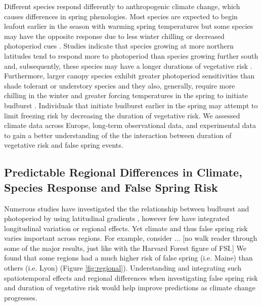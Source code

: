 \documentclass{article}\usepackage[]{graphicx}\usepackage[]{color}
\begin{document}
Different species respond differently to anthropogenic climate change, which causes differences in spring phenologies. Most species are expected to begin leafout earlier in the season with warming spring temperatures but some species may have the opposite response due to less winter chilling or decreased photoperiod cues \citep{Cleland2006, Yu2010, Xin2016}. Studies indicate that species growing at more northern latitudes tend to respond more to photoperiod than species growing further south and, subsequently, these species may have a longer durations of vegetative risk \citep {Partanen2004, Viheraaarnio2006, Caffarra2011}. Furthermore, larger canopy species exhibit greater photoperiod sensitivities than shade tolerant or understory species \citep{Basler2012} and they also, generally, require more chilling in the winter and greater forcing temperatures in the spring to initiate budburst \citep{Laube2013}. Individuals that initiate budburst earlier in the spring may attempt to limit freezing risk by decreasing the duration of vegetative risk. We assessed climate data across Europe, long-term observational data, and experimental data to gain a better understanding of the the interaction between duration of vegetative risk and false spring events.  

\subsection {Predictable Regional Differences in Climate, Species Response and False Spring Risk}
Numerous studies have investigated the the relationship between budburst and photoperiod by using latitudinal gradients \citep{Partanen2004, Viheraaarnio2006, Caffarra2011, Zohner2016, Gauzere2017}, however few have integrated longitudinal variation or regional effects. Yet climate and thus false spring risk varies important across regions. For example, consider ... [no walk reader through some of the major results, just like with the Harvard Forest figure of FSI.] We found that some regions had a much higher risk of false spring (i.e. Maine) than others (i.e. Lyon) (Figure \ref{fig:regional}). Understanding and integrating such spatiotemporal effects and regional differences when investigating false spring risk and duration of vegetative risk would help improve predictions as climate change progresses.
\end{document}
